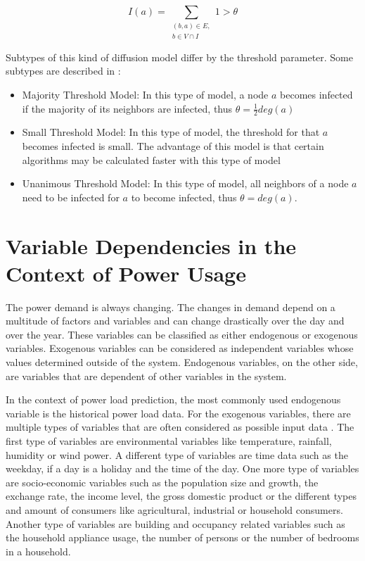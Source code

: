 \begin{equation}
    I(a) = \sum\limits_{\substack{(b,a)\in E, \\ b \in V \cap I}}
    1 > \theta    
    \label{eq:threshold}
\end{equation}

Subtypes of this kind of diffusion model differ by the threshold parameter.
Some subtypes are described in \cite{diffusionbasics}:

\begin{itemize}
    \item Majority Threshold Model: In this type of model, a node $a$ becomes
    infected if the majority of its neighbors are infected, thus 
    $\theta = \frac{1}{2}deg(a)$
    \item Small Threshold Model: In this type of model, the threshold for that
    $a$ becomes infected is small. The advantage of this model is that 
    certain algorithms may be calculated faster with this type of model 
    \cite{diffusionbasics} 
    \item Unanimous Threshold Model: In this type of model, all neighbors 
    of a node $a$ need to be infected for $a$ to become infected, thus
    $\theta = deg(a)$.
\end{itemize}

\section{Variable Dependencies in the Context of Power Usage}

The power demand is always changing. The changes in demand depend on a multitude 
of factors and variables and can change drastically over the day and over the year.
These variables can be classified as either endogenous or exogenous variables.
Exogenous variables can be considered as independent variables 
whose values determined outside of the system. 
Endogenous variables, on the other side, 
are variables that are dependent of other variables in the 
system.

In the context of power load prediction, the most commonly 
used endogenous variable is the historical power load data.
For the exogenous variables, there are multiple types of 
variables that are often considered as possible input data \cite{exogenousdata}
\cite{exogenousdata2}.
The first type of variables are environmental variables like temperature, 
rainfall, humidity or wind power. A different type of variables are time data
such as the weekday, if a day is a holiday and the time of the day.
One more type of variables are socio-economic variables such as the
population size and growth, the exchange rate, the income level,
the gross domestic product or the different types and amount 
of consumers like agricultural, industrial or household consumers.
Another type of variables are building and occupancy related variables such
as the household appliance usage,
the number of persons or the number of bedrooms in a household.

